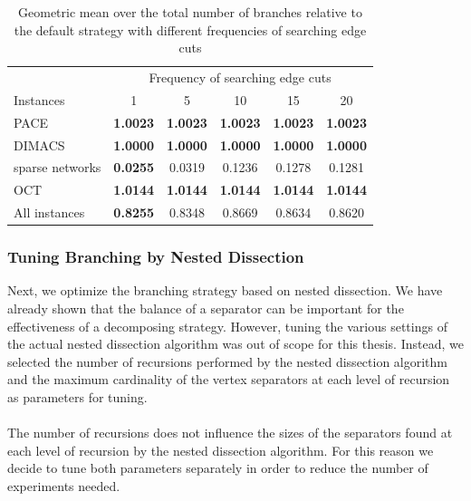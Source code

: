 \documentclass[12pt,a4paper,twoside]{scrartcl}
\numberwithin{equation}{section}
\begin{document}
\begin{table}[hbt!]
	\centering
	\begin{tabular}{l|ccccc|}	  & \multicolumn{5}{c|}{Frequency of searching edge cuts} \\ \cline{2-6}
		Instances & 1 & 5 & 10 & 15 & 20\\
		\hline
		PACE & \textbf{1.0023} & \textbf{1.0023} & \textbf{1.0023} & \textbf{1.0023} & \textbf{1.0023} \\
		DIMACS & \textbf{1.0000} & \textbf{1.0000} & \textbf{1.0000} & \textbf{1.0000} & \textbf{1.0000} \\
		sparse networks & \textbf{0.0255} & 0.0319 & 0.1236 & 0.1278 & 0.1281 \\
		OCT & \textbf{1.0144} & \textbf{1.0144} & \textbf{1.0144} & \textbf{1.0144} & \textbf{1.0144} \\
		All instances & \textbf{0.8255} & 0.8348 & 0.8669 & 0.8634 & 0.8620 \\\hline
	\end{tabular}
	
	\caption{Geometric mean over the total number of branches relative to the default strategy with different frequencies of searching edge cuts}
	\label{tab:levels2}
	
\end{table}
\subsubsection{Tuning Branching by Nested Dissection}
Next, we optimize the branching strategy based on nested dissection. We have already shown that the balance of a separator can be important for the effectiveness of a decomposing strategy. However, tuning the various settings of the actual nested dissection algorithm was out of scope for this thesis. Instead, we selected the number of recursions performed by the nested dissection algorithm and the maximum cardinality of the vertex separators at each level of recursion as parameters for tuning.

\paragraph{}
The number of recursions does not influence the sizes of the separators found at each level of recursion by the nested dissection algorithm. For this reason we decide to tune both parameters separately in order to reduce the number of experiments needed.
\end{document}
